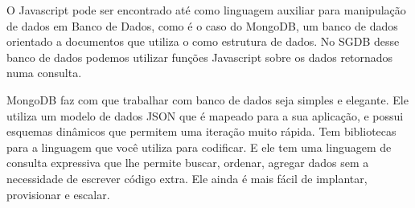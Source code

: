 O Javascript pode ser encontrado até como linguagem auxiliar para manipulação de dados em Banco de Dados, como é o caso do MongoDB, um banco de dados orientado a documentos que utiliza o  como estrutura de dados.
No SGDB desse banco de dados podemos utilizar funções Javascript sobre os dados retornados numa consulta.
\begin{citacao}
MongoDB faz com que trabalhar com banco de dados seja simples e elegante. Ele utiliza um modelo de dados JSON que é mapeado para a sua aplicação, e possui esquemas dinâmicos que permitem uma iteração muito rápida. Tem bibliotecas para a linguagem que você utiliza para codificar. E ele tem uma linguagem de consulta expressiva que lhe permite buscar, ordenar, agregar dados sem a necessidade de escrever código extra. Ele ainda é mais fácil de implantar, provisionar e escalar.\cite{mongodb}
\end{citacao}
